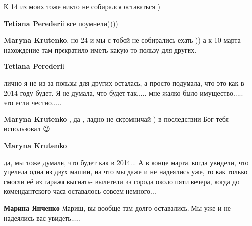  
 
 
 
 

\qqSecCmt


К 14 из моих тоже никто не собирался оставаться )

\begin{itemize} %
\textbf{Tetiana Perederii} все поумнели))))

\textbf{Maryna Krutenko}, но 24 и мы с тобой не собирались ехать )) а к 10 марта нахождение там прекратило иметь какую-то пользу для других.

\textbf{Tetiana Perederii} 

лично я не из-за пользы для других осталась, а просто подумала, что это как в
2014 году будет. Я не думала, что будет так..... мне жалко было имущество.....
это если честно.....

\textbf{Maryna Krutenko} , да , ладно не скромничай ) в последствии Бог тебя использовал 😉

\textbf{Maryna Krutenko} 

да, мы тоже думали, что будет как в 2014... А в конце марта, когда увидели, что
уцелела одна из двух машин, на что мы даже и не надеялись уже, то как только
смогли её из гаража выгнать- вылетели из города около пяти вечера, когда до
комендантского часа оставалось совсем немного...

\textbf{Марина Янченко} Мариш, вы вообще там долго оставались. Мы уже и не надеялись вас увидеть.....
\end{itemize} %
